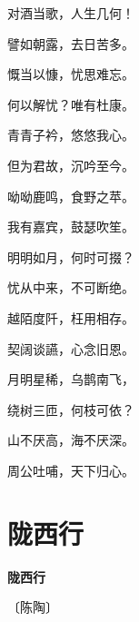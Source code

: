 \documentclass[12pt,UTF-8,openany,fontset=none]{ctexbook}
\begin{document}
\begin{center}
    \begin{Large}

        对酒当歌，人生几何！

        譬如朝露，去日苦多。

        慨当以慷，忧思难忘。

        何以解忧？唯有杜康。

        \vspace{18pt}  %

        青青子衿，悠悠我心。

        但为君故，沉吟至今。

        呦呦鹿鸣，食野之苹。

        我有嘉宾，鼓瑟吹笙。

        \vspace{18pt}  %

        明明如月，何时可掇？

        忧从中来，不可断绝。

        越陌度阡，枉用相存。

        契阔谈讌，心念旧恩。

        \vspace{18pt}  %

        月明星稀，乌鹊南飞，

        绕树三匝，何枝可依？

        山不厌高，海不厌深。

        周公吐哺，天下归心。

    \end{Large}

\end{center}

\vspace{8pt}
\clearpage

\section{陇西行}


\begin{center}
    {\bfseries 陇西行}

    \vspace{18pt}

    \begin{large}\xuwen
        〔陈陶〕
    \end{large}

\end{center}
\end{document}
